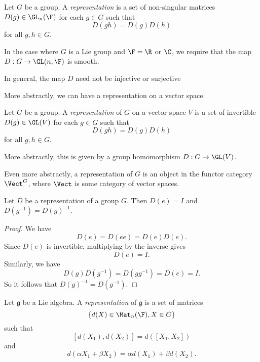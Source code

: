 \documentclass[a4paper]{article}
\begin{document}
\begin{defi}
  Let $G$ be a group. A \emph{representation} is a set of non-singular matrices $D(g) \in \GL_n(\F)$ for each $g \in G$ such that
  \[
    D(gh) = D(g)D(h)
  \]
  for all $g, h \in G$.

  In the case where $G$ is a Lie group and $\F = \R$ or $\C$, we require that the map $D: G \to \GL(n, \F)$ is smooth.
\end{defi}
In general, the map $D$ need not be injective or surjective

\begin{own}
  More abstractly, we can have a representation on a vector space.
  \begin{defi}
    Let $G$ be a group. A \emph{representation} of $G$ on a vector space $V$ is a set of invertible $D(g) \in \GL(V)$ for each $g \in G$ such that
    \[
      D(gh) = D(g)D(h)
    \]
    for all $g, h \in G$.

    More abstractly, this is given by a group homomorphism $D: G \to \GL(V)$.

    Even more abstractly, a representation of $G$ is an object in the functor category $\Vect^G$, where $\Vect$ is some category of vector spaces.
  \end{defi}
\end{own}
\begin{prop}
  Let $D$ be a representation of a group $G$. Then $D(e) = I$ and $D(g^{-1}) = D(g)^{-1}$.
\end{prop}

\begin{proof}
  We have
  \[
    D(e) = D(ee) = D(e) D(e).
  \]
  Since $D(e)$ is invertible, multiplying by the inverse gives
  \[
    D(e) = I.
  \]
  Similarly, we have
  \[
    D(g) D(g^{-1}) = D(gg^{-1})= D(e) = I.
  \]
  So it follows that $D(g)^{-1} = D(g^{-1})$.
\end{proof}

\begin{defi}
  Let $\mathfrak{g}$ be a Lie algebra. A \emph{representation} of $\mathfrak{g}$ is a set of matrices
  \[
    \{d(X) \in \Mat_n(\F), X \in G\}
  \]
  such that
  \[
    [d(X_1), d(X_2)] = d([X_1, X_2])
  \]
  and
  \[
    d(\alpha X_1 + \beta X_2) = \alpha d(X_1) + \beta d(X_2).
  \]
\end{defi}
\end{document}
